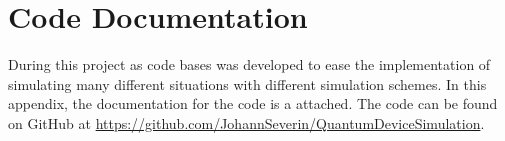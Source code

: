 \chapter{Code Documentation}\label{chap:code_documentation}
During this project as code bases was developed to ease the implementation of simulating many different situations with different simulation schemes. In this appendix, the documentation for the code is a attached. The code can be found on GitHub at \url{https://github.com/JohannSeverin/QuantumDeviceSimulation}. 





